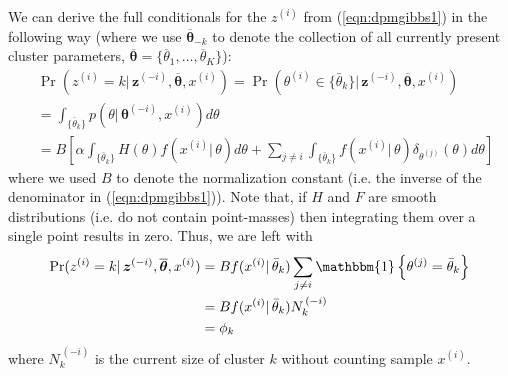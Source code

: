 \documentclass[final,3p,times,twocolumn]{elsarticle}
\let\bs\boldsymbol
\begin{document}
We can derive the full conditionals for the $z^{(i)}$ from (\ref{eqn:dpmgibbs1}) in the following way (where we use $\overline {\bs \theta}_{-k}$ to denote the collection of all currently present cluster parameters, $\bs{\overline\theta}=\{\overline \theta_1,\dots,\overline \theta_K\}$):
\begin{equation}
\begin{split}
&\Pr(z^{(i)}=k|\,\bs z^{(-i)},\overline {\bs \theta},x^{(i)}) = \Pr(\theta^{(i)} \in \{\bar \theta_k\}|\,\bs z^{(-i)},\overline {\bs \theta},x^{(i)})\\
&= \int_{\{\bar \theta_k\}} p(\theta|\,\bs\theta^{(-i)},x^{(i)}) d\theta\\
&= B \left[\alpha\int_{\{\bar \theta_k\}} H(\theta)f(x^{(i)}|\,\theta)d\theta + \sum_{j\neq i}\int_{\{\bar \theta_k\}}f(x^{(i)}|\,\theta)\delta_{\theta^{(j)}}(\theta)d\theta\right]
\end{split}
\end{equation}
where we used $B$ to denote the normalization constant (i.e. the inverse of the denominator in (\ref{eqn:dpmgibbs1})).
Note that, if $H$ and $F$ are smooth distributions (i.e. do not contain point-masses) then integrating them over a single point results in zero.
Thus, we are left with
\begin{equation}
\label{eqn:phi_k}
\begin{split}
\Pr(z^{(i)}=k|\,\bs z^{(-i)},\overline {\bs \theta},x^{(i)}) &= B f(x^{(i)}|\,\bar\theta_k)\sum_{j\neq i}\mathbbm{1}\left\{\theta^{(j)} = \bar \theta_k\right\} \\
&= B f(x^{(i)}|\,\bar\theta_k)N_k^{\,(-i)}\\
&= \phi_k
\end{split}
\end{equation}
where $N_k^{\,(-i)}$ is the current size of cluster $k$ without counting sample $x^{(i)}$.
\end{document}
